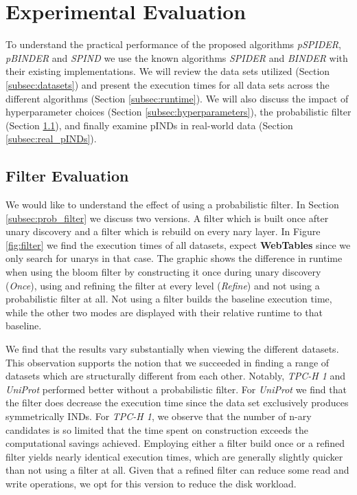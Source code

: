 \chapter{Experimental Evaluation}\label{sec:eval}
To understand the practical performance of the proposed algorithms \textit{pSPIDER}, \textit{pBINDER} and \textit{SPIND} we use the known algorithms \textit{SPIDER} and \textit{BINDER} with their existing implementations. We will review the data sets utilized (Section \ref{subsec:datasets}) and present the execution times for all data sets across the different algorithms (Section \ref{subsec:runtime}). We will also discuss the impact of hyperparameter choices (Section \ref{subsec:hyperparameters}), the probabilistic filter (Section \ref{subsec:filter_res}), and finally examine pINDs in real-world data (Section \ref{subsec:real_pINDs}).



\section{Filter Evaluation} \label{subsec:filter_res}
We would like to understand the effect of using a probabilistic filter. In Section \ref{subsec:prob_filter} we discuss two versions. A filter which is built once after unary discovery and a filter which is rebuild on every nary layer. In Figure \ref{fig:filter} we find the execution times of all datasets, expect \textbf{WebTables} since we only search for unarys in that case. The graphic shows the difference in runtime when using the bloom filter by constructing it once during unary discovery (\textit{Once}), using and refining the filter at every level (\textit{Refine}) and not using a probabilistic filter at all. Not using a filter builds the baseline execution time, while the other two modes are displayed with their relative runtime to that baseline.

We find that the results vary substantially when viewing the different datasets. This observation supports the notion that we succeeded in finding a range of datasets which are structurally different from each other. Notably, \textit{TPC-H 1} and \textit{UniProt} performed better without a probabilistic filter. For \textit{UniProt} we find that the filter does decrease the execution time since the data set exclusively produces symmetrically INDs. For \textit{TPC-H 1}, we observe that the number of n-ary candidates is so limited that the time spent on construction exceeds the computational savings achieved. Employing either a filter build once or a refined filter yields nearly identical execution times, which are generally slightly quicker than not using a filter at all. Given that a refined filter can reduce some read and write operations, we opt for this version to reduce the disk workload.

